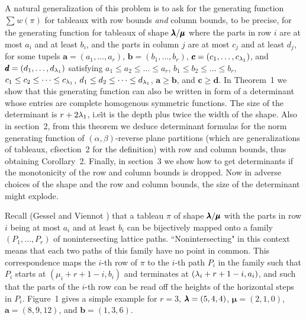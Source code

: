 A natural generalization of this problem is to ask for the generating
function $\sum _{} ^{}w(\pi)$
for tableaux with row bounds {\it and} column
bounds, to be precise, for the generating function
for tableaux of shape $\pmb{\lambda}/\pmb\mu$ where
the parts in row $i$ are at most $a_i$ and at least $b_i$, and the
parts
in column $j$ are at most $c_j$ and at least $d_j$, for some tupels
$\pmb a=(a_1,\dots,a_r)$, $\pmb b=(b_1,\dots,b_r)$,
$\pmb c=(c_1,\dots,c_{\lambda_1})$, and $\pmb d=(d_1,\dots,d_{\lambda_1})$ satisfying
$a_1\le a_2\le\dots\le a_r$, $b_1\le b_2\le\dots\le b_r$,
$c_1\le c_2\le\dots\le c_{\lambda_1}$, $d_1\le d_2\le\dots\le d_{\lambda_1}$, $\pmb
a\ge\pmb b$, and $\pmb c\ge\pmb d$. In Theorem~1 we show that this generating
function can also be written in form of a determinant whose entries are 
complete
homogenous symmetric functions. The size of the determinant is
$r+2\lambda_1$, i.e\. it is the depth plus twice the width of the shape.
Also in section~2, from this theorem we deduce determinant formulas
for the norm generating function of $(\alpha
,\beta
)$-reverse 
plane partitions
(which are generalizations of tableaux, cf\. section~2 for the
definition) with row and
column bounds, thus obtaining Corollary~2. Finally, in section~3 we
show how to get determinants if the monotonicity of the row and
column bounds is dropped. Now in adverse choices of the shape and the
row and column bounds, the size of the determinant might explode.
\newpage



 Recall
(Gessel and Viennot \cite{3,4}) that a tableau $\pi$ of shape
$\pmb{\lambda}/\pmb\mu$ with
the parts in row $i$ being at most $a_i$ and at least $b_i$ can be
bijectively mapped onto a family $(P_1,\dots,P_r)$ of nonintersecting
lattice paths. ``Nonintersecting" in this context
 means that each two paths of this family have no
point in common. This correspondence maps the $i$-th row of $\pi$ to
the $i$-th path $P_i$ in the family such that $P_i$ starts at
$(\mu_i+r+1-i,b_i)$
and terminates at $(\lambda_i+r+1-i,a_i)$, and such that the parts of 
the $i$-th row can
be read off the heights of the horizontal steps in $P_i$. 
Figure~1 gives a simple example for $r=3$, $\pmb{\lambda}=(5,4,4)$,
$\pmb\mu=(2,1,0)$,
$\pmb a=(8,9,12)$, and $\pmb b=(1,3,6)$.

